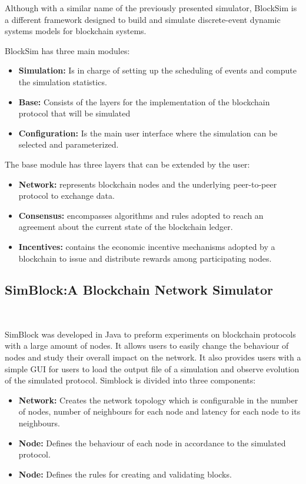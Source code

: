 Although with a similar name of the previously presented simulator, BlockSim is a different 
framework designed to build and simulate discrete-event dynamic systems models for blockchain systems.

BlockSim has three main modules:
\begin{itemize}
  \item \textbf{Simulation:} Is in charge of setting up the scheduling of events and compute
  the simulation statistics.
  \item \textbf{Base:} Consists of the layers for the implementation of the blockchain protocol
  that will be simulated
  \item \textbf{Configuration:}  Is the main user interface where the simulation can be 
  selected and parameterized.
\end{itemize}

The base module has three layers that can be extended by the user:

\begin{itemize}
  \item \textbf{Network:} represents blockchain nodes and the underlying peer-to-peer protocol
  to exchange data.
  \item \textbf{Consensus:} encompasses algorithms and rules adopted to reach an agreement 
  about the current state of the blockchain ledger.
  \item \textbf{Incentives:} contains the economic incentive mechanisms adopted by a 
  blockchain to issue and distribute rewards among participating nodes.
\end{itemize}

\subsection{SimBlock:A Blockchain Network Simulator}~\label{subsec:simblock}

SimBlock was developed in Java to preform experiments on blockchain protocols
with a large amount of nodes. It allows users to easily change the behaviour of nodes
and study their overall impact on the network. It also provides users with a simple GUI for
users to load the output file of a simulation and observe evolution of the simulated protocol.
Simblock is divided into three components:

\begin{itemize}
  \item \textbf{Network:} Creates the network topology which is configurable in the number
  of nodes, number of neighbours for each node and latency for each node to its neighbours.
  \item \textbf{Node:} Defines the behaviour of each node in accordance to the simulated protocol.
  \item \textbf{Node:} Defines the rules for creating and validating blocks.
\end{itemize}

